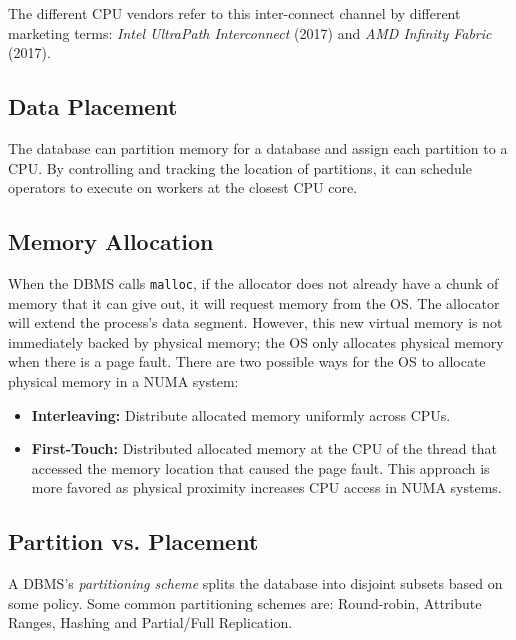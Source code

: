\documentclass[11pt]{article}
\begin{document}
The different CPU vendors refer to this inter-connect channel by different marketing terms: 
\textit{Intel UltraPath Interconnect} (2017) and \textit{AMD Infinity Fabric} (2017).

\subsection*{Data Placement}
The database can partition memory for a database and assign each partition to a CPU. By controlling 
and tracking the location of partitions, it can schedule operators to execute on workers at the 
closest CPU core.

\subsection*{Memory Allocation}
When the DBMS calls \texttt{malloc}, if the allocator does not already have a chunk of memory that 
it can give out, it will request memory from the OS. The allocator will extend the process's data 
segment. However, this new virtual memory is not immediately backed by physical memory; the OS only 
allocates physical memory when there is a page fault. There are two possible ways for the OS to 
allocate physical memory in a NUMA system:

\begin{itemize}
    \item \textbf{Interleaving:}
    Distribute allocated memory uniformly across CPUs.
  
    \item \textbf{First-Touch:}
    Distributed allocated memory at the CPU of the thread that accessed 
    the memory location that caused the page fault. This approach is more favored as physical 
    proximity increases CPU access in NUMA systems.
\end{itemize}

\subsection*{Partition vs. Placement}
A DBMS's \textit{partitioning scheme} splits the database into disjoint subsets based on some 
policy. Some common partitioning schemes are: Round-robin, Attribute Ranges, Hashing and 
Partial/Full Replication. 
\end{document}
